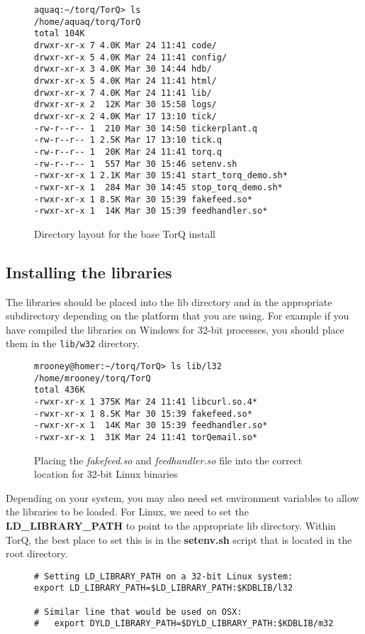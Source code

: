 \begin{figure}[h]
\begin{lstlisting}
aquaq:~/torq/TorQ> ls
/home/aquaq/torq/TorQ
total 104K
drwxr-xr-x 7 4.0K Mar 24 11:41 code/
drwxr-xr-x 5 4.0K Mar 24 11:41 config/
drwxr-xr-x 3 4.0K Mar 30 14:44 hdb/
drwxr-xr-x 5 4.0K Mar 24 11:41 html/
drwxr-xr-x 7 4.0K Mar 24 11:41 lib/
drwxr-xr-x 2  12K Mar 30 15:58 logs/
drwxr-xr-x 2 4.0K Mar 17 13:10 tick/
-rw-r--r-- 1  210 Mar 30 14:50 tickerplant.q
-rw-r--r-- 1 2.5K Mar 17 13:10 tick.q
-rw-r--r-- 1  20K Mar 24 11:41 torq.q
-rw-r--r-- 1  557 Mar 30 15:46 setenv.sh
-rwxr-xr-x 1 2.1K Mar 30 15:41 start_torq_demo.sh*
-rwxr-xr-x 1  284 Mar 30 14:45 stop_torq_demo.sh*
-rwxr-xr-x 1 8.5K Mar 30 15:39 fakefeed.so*
-rwxr-xr-x 1  14K Mar 30 15:39 feedhandler.so*
\end{lstlisting}
\caption{Directory layout for the base TorQ install}
\end{figure}

\subsection{Installing the libraries}

The libraries should be placed into the lib directory and in the appropriate subdirectory depending on the platform that you are using. For example if you have compiled the libraries on
Windows for 32-bit processes, you should place them in the \verb|lib/w32| directory.

\begin{figure}[h]
\begin{lstlisting}
mrooney@homer:~/torq/TorQ> ls lib/l32
/home/mrooney/torq/TorQ
total 436K
-rwxr-xr-x 1 375K Mar 24 11:41 libcurl.so.4*
-rwxr-xr-x 1 8.5K Mar 30 15:39 fakefeed.so*
-rwxr-xr-x 1  14K Mar 30 15:39 feedhandler.so*
-rwxr-xr-x 1  31K Mar 24 11:41 torQemail.so*
\end{lstlisting}
\caption{Placing the \textit{fakefeed.so} and \textit{feedhandler.so} file into the correct location for 32-bit Linux binaries}
\end{figure}

Depending on your system, you may also need set environment variables to allow the libraries to be loaded. For Linux, we need to set the
\textbf{LD\_LIBRARY\_PATH} to point to the appropriate lib directory. Within TorQ, the best place to set this is in the \textbf{setenv.sh}
script that is located in the root directory.

\begin{figure}[h]
\begin{lstlisting}
# Setting LD_LIBRARY_PATH on a 32-bit Linux system:
export LD_LIBRARY_PATH=$LD_LIBRARY_PATH:$KDBLIB/l32

# Similar line that would be used on OSX:
# 	export DYLD_LIBRARY_PATH=$DYLD_LIBRARY_PATH:$KDBLIB/m32
\end{lstlisting}
\caption{}
\end{figure}

